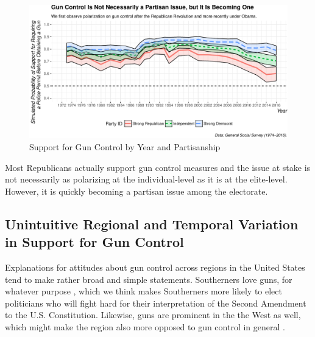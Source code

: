 \documentclass[11pt,]{article}
\makeatletter
\def\maxwidth{\ifdim\Gin@nat@width>\linewidth\linewidth
\else\Gin@nat@width\fi}
\let\Oldincludegraphics\includegraphics
\renewcommand{\includegraphics}[1]{\Oldincludegraphics[width=\maxwidth]{#1}}
\makeatother
\begin{document}
\begin{figure}[htbp]
\centering
\includegraphics{gss-guns_files/figure-latex/simyear-1.pdf}
\caption{\label{fig:simyear} Support for Gun Control by Year and
Partisanship}
\end{figure}

Most Republicans actually support gun control measures and the issue at
stake is not necessarily as polarizing at the individual-level as it is
at the elite-level. However, it is quickly becoming a partisan issue
among the electorate.

\subsection{Unintuitive Regional and Temporal Variation in Support for
Gun
Control}\label{unintuitive-regional-and-temporal-variation-in-support-for-gun-control}

Explanations for attitudes about gun control across regions in the
United States tend to make rather broad and simple statements.
Southerners love guns, for whatever purpose
\citep[e.g][]{brennanetal1993gsgc}, which we think makes Southerners
more likely to elect politicians who will fight hard for their
interpretation of the Second Amendment to the U.S. Constitution.
Likewise, guns are prominent in the the West as well, which might make
the region also more opposed to gun control in general
\citep{wolpertgimpel1998sisp}.
\end{document}
